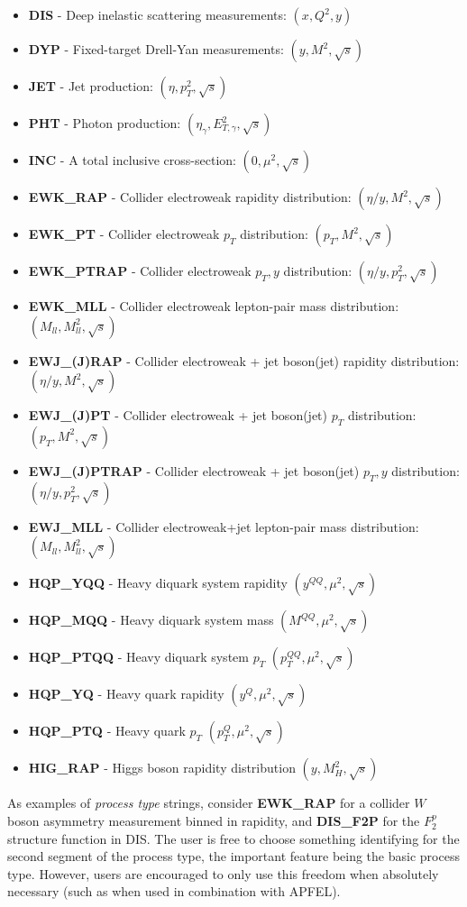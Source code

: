 \documentclass[11pt]{article}
\begin{document}
\begin{itemize}
\item \textbf{DIS} - Deep inelastic scattering measurements: $(x,Q^2,y)$
\item \textbf{DYP} - Fixed-target Drell-Yan measurements: $(y,M^2,\sqrt{s})$
\item \textbf{JET} - Jet production: $(\eta,p_T^2,\sqrt{s})$
\item \textbf{PHT} - Photon production: $(\eta_\gamma,E_{T,\gamma}^2,\sqrt{s})$
\item \textbf{INC} - A total inclusive cross-section: $(0,\mu^2,\sqrt{s})$
\item \textbf{EWK\_RAP} - Collider electroweak rapidity distribution: $(\eta/y,M^2,\sqrt{s})$
\item \textbf{EWK\_PT} - Collider electroweak $p_T$ distribution: $(p_T,M^2,\sqrt{s})$
\item \textbf{EWK\_PTRAP} - Collider electroweak $p_T, y$ distribution: $(\eta/y, p_T^2,\sqrt{s})$
\item \textbf{EWK\_MLL} - Collider electroweak lepton-pair mass distribution: $(M_{ll},M_{ll}^2,\sqrt{s})$
\item \textbf{EWJ\_(J)RAP} - Collider electroweak + jet boson(jet) rapidity distribution: $(\eta/y,M^2,\sqrt{s})$
\item \textbf{EWJ\_(J)PT} - Collider electroweak + jet boson(jet) $p_T$ distribution: $(p_T,M^2,\sqrt{s})$
\item \textbf{EWJ\_(J)PTRAP} - Collider electroweak + jet boson(jet) $p_T, y$ distribution: $(\eta/y, p_T^2,\sqrt{s})$
\item \textbf{EWJ\_MLL} - Collider electroweak+jet lepton-pair mass distribution: $(M_{ll},M_{ll}^2,\sqrt{s})$
\item \textbf{HQP\_YQQ} - Heavy diquark system rapidity $(y^{QQ},\mu^2,\sqrt{s})$
\item \textbf{HQP\_MQQ} - Heavy diquark system mass $(M^{QQ},\mu^2,\sqrt{s})$
\item \textbf{HQP\_PTQQ} - Heavy diquark system $p_T$ $(p_T^{QQ},\mu^2,\sqrt{s})$
\item \textbf{HQP\_YQ} - Heavy quark rapidity $(y^Q,\mu^2,\sqrt{s})$
\item \textbf{HQP\_PTQ} - Heavy quark $p_T$ $(p_T^Q,\mu^2,\sqrt{s})$
\item \textbf{HIG\_RAP} - Higgs boson rapidity distribution $(y,M_H^2,\sqrt{s})$
\end{itemize}

As examples of \emph{process type} strings, consider \textbf{EWK\_RAP} for a
collider $W$ boson asymmetry measurement binned in rapidity, and
\textbf{DIS\_F2P} for the $F_2^p$ structure function in DIS. The user is free to
choose something identifying for the second segment of the process type, the
important feature being the basic process type. However, users are encouraged to
only use this freedom when absolutely necessary (such as when used in
combination with APFEL).
\end{document}
